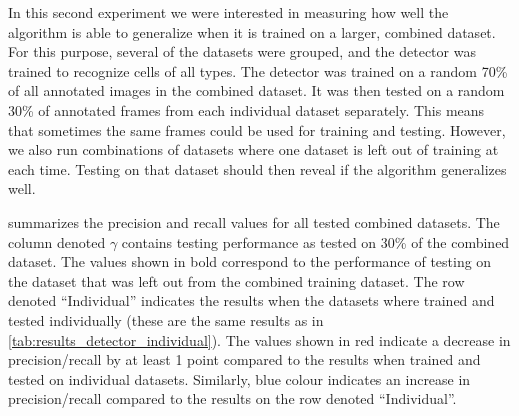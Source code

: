 		In this second experiment we were interested in measuring how well the algorithm is able to generalize when it is trained on a larger, combined dataset. For this purpose, several of the datasets were grouped, and the detector was trained to recognize cells of all types. The detector was trained on a random 70\% of all annotated images in the combined dataset. It was then tested on a random 30\% of annotated frames from each individual dataset separately. This means that sometimes the same frames could be used for training and testing. However, we also run combinations of datasets where one dataset is left out of training at each time. Testing on that dataset should then reveal if the algorithm generalizes well.
		
		 summarizes the precision and recall values for all tested combined datasets. The column denoted $\gamma$ contains testing performance as tested on 30\% of the combined dataset. The values shown in bold correspond to the performance of testing on the dataset that was left out from the combined training dataset. The row denoted ``Individual'' indicates the results when the datasets where trained and tested individually (these are the same results as in \cref{tab:results_detector_individual}). The values shown in red indicate a decrease in precision/recall by at least 1 point compared to the results when trained and tested on individual datasets. Similarly, blue colour indicates an increase in precision/recall compared to the results on the row denoted ``Individual''.
		
		
